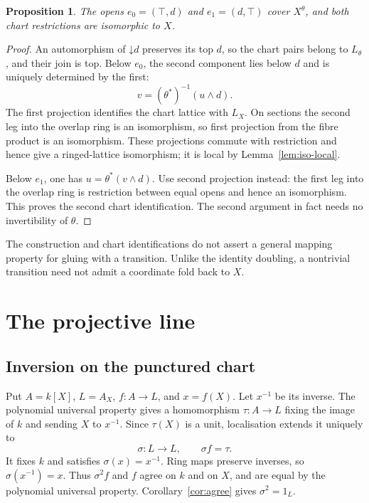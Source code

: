 \documentclass[11pt]{amsart}
\newtheorem{proposition}[theorem]{Proposition}
\theoremstyle{definition}
\theoremstyle{remark}
\begin{document}
\begin{proposition}\label{prop:transition-charts}
The opens $e_0=(\top,d)$ and $e_1=(d,\top)$ cover $X^\theta$, and
both chart restrictions are isomorphic to $X$.
\end{proposition}
\begin{proof}
An automorphism of $\mathord\downarrow d$ preserves its top $d$, so
the chart pairs belong to $L_\theta$, and their join is top.
Below $e_0$, the second component lies below $d$ and is uniquely
determined by the first:
\[
 v=(\theta^*)^{-1}(u\wedge d).
\]
The first projection identifies the chart lattice with $L_X$. On
sections the second leg into the overlap ring is an isomorphism, so
first projection from the fibre product is an isomorphism. These
projections commute with restriction and hence give a ringed-lattice
isomorphism; it is local by Lemma~\ref{lem:iso-local}.

Below $e_1$, one has $u=\theta^*(v\wedge d)$. Use second projection
instead: the first leg into the overlap ring is restriction between
equal opens and hence an isomorphism. This proves the second chart
identification. The second argument in fact needs no invertibility of
$\theta$.
\end{proof}

The construction and chart identifications do not assert a general
mapping property for gluing with a transition. Unlike the identity
doubling, a nontrivial transition need not admit a coordinate fold back
to $X$.

\section{The projective line}

\subsection{Inversion on the punctured chart}
Put $A=k[X]$, $L=A_X$, $f:A\to L$, and $x=f(X)$.
Let $x^{-1}$ be its inverse. The polynomial universal property gives a
homomorphism $\tau:A\to L$ fixing the image of $k$ and sending $X$ to
$x^{-1}$. Since $\tau(X)$ is a unit, localisation extends it uniquely to
\[
 \sigma:L\longrightarrow L,\qquad \sigma f=\tau.
\]
It fixes $k$ and satisfies $\sigma(x)=x^{-1}$. Ring maps preserve
inverses, so $\sigma(x^{-1})=x$. Thus $\sigma^2f$ and $f$ agree on $k$
and on $X$, and are equal by the polynomial universal property.
Corollary~\ref{cor:agree} gives $\sigma^2=1_L$.
\end{document}

